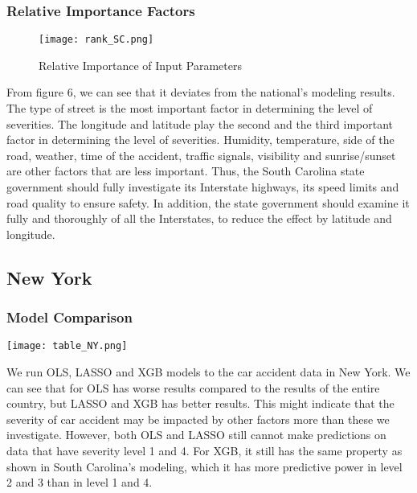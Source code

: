 \documentclass[twocolumn]{article}
\begin{document}
\subsubsection{Relative Importance Factors}
\begin{figure}[h]
    \centering
    \texttt{[image: rank\_SC.png]}
    \caption{Relative Importance of Input Parameters}
\end{figure}
From figure 6, we can see that it deviates from the national's modeling results. The type of street is the most important factor in determining the level of severities. The longitude and latitude play the second and the third important factor in determining the level of severities. Humidity, temperature, side of the road, weather, time of the accident, traffic signals, visibility and sunrise/sunset are other factors that are less important. Thus, the South Carolina state government should fully investigate its Interstate highways, its speed limits and road quality to ensure safety. In addition, the state government should examine it fully and thoroughly of all the Interstates, to reduce the effect by latitude and longitude. 



\subsection{New York}
\subsubsection{Model Comparison}
\begin{table}[h]
    \centering
    \texttt{[image: table\_NY.png]}
    \caption{}
\end{table}
We run OLS, LASSO and XGB models to the car accident data in New York. We can see that for OLS has worse results compared to the results of the entire country, but LASSO and XGB has better results. This might indicate that the severity of car accident may be impacted by other factors more than these we investigate. However, both OLS and LASSO still cannot make predictions on data that have severity level 1 and 4. For XGB, it still has the same property as shown in South Carolina's modeling, which it has more predictive power in level 2 and 3 than in level 1 and 4.  
\end{document}

